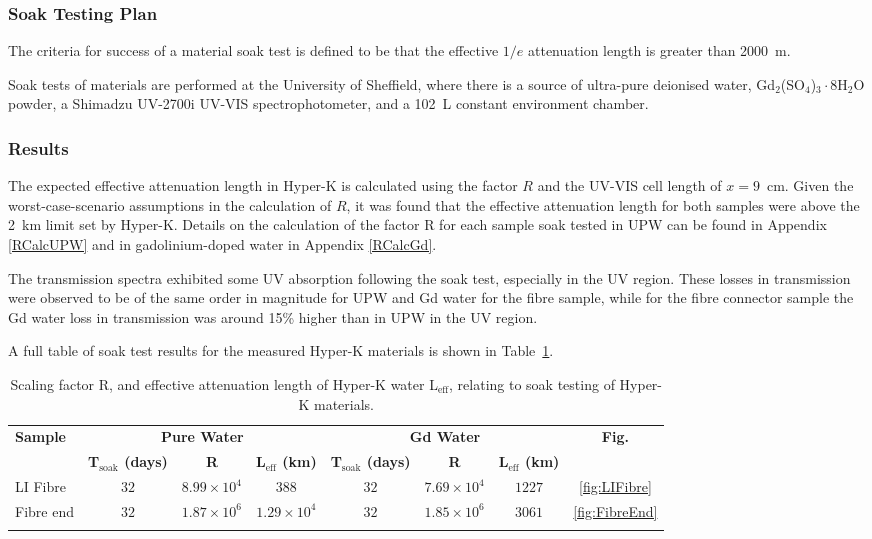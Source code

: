 \documentclass[a4paper,11pt]{article}
\newcommand{\hk}{Hyper-K\xspace}
\begin{document}
\subsubsection{Soak Testing Plan}
The criteria for success of a material soak test is defined to be that the effective $1/e$ attenuation length is greater than 2000~m.

Soak tests of materials are performed at the University of Sheffield, where there is a source of ultra-pure deionised water, Gd$_2$(SO$_4$)$_3\cdot$8H$_2$O powder, a Shimadzu UV-2700i UV-VIS spectrophotometer, and a 102~L constant environment chamber.

\subsubsection{Results}

The expected effective attenuation length in \hk is calculated using the factor $R$ and the UV-VIS cell length of $x=9$~cm. Given the worst-case-scenario assumptions in the calculation of $R$, it was found that the effective attenuation length for both samples were above the 2~km limit set by \hk. Details on the calculation of the factor R for each sample soak tested in UPW can be found in Appendix \ref{RCalcUPW} and in gadolinium-doped water in Appendix \ref{RCalcGd}.

The transmission spectra exhibited some UV absorption following the soak test, especially in the UV region. These losses in transmission were observed to be of the same order in magnitude for UPW and Gd water for the fibre sample, while for the fibre connector sample the Gd water loss in transmission was around 15\% higher than in UPW in the UV region. 

A full table of soak test results for the measured \hk materials is shown in Table~\ref{tab:soakresults}.

\begin{longtable}{lccccccc}
\hline
\multirow{2}{*}{\textbf{Sample}} & \multicolumn{3}{c}{\textbf{Pure Water}} & \multicolumn{3}{c}{\textbf{Gd Water}} & \multirow{2}{*}{\textbf{Fig.}} \\ \cmidrule(l){2-4} \cmidrule(l){5-7} 
& \textbf{T$_\text{soak}$ (days)} & \textbf{R} & \textbf{L$_\text{eff}$ (km)} & \textbf{T$_\text{soak}$ (days)} & \textbf{R} & \textbf{L$_\text{eff}$ (km)} &  \\ \hline
LI Fibre & $32$ & $8.99 \times 10^4$ & $388$ & $32$ & $7.69 \times 10^4$ & $1227$ & \ref{fig:LIFibre} \\
Fibre end & $32$ & $1.87 \times 10^6$ & $1.29 \times 10^4$ & $32$ & $1.85 \times 10^6$ & $3061$ & \ref{fig:FibreEnd} \\
\hline
\caption{Scaling factor R, and effective attenuation length of \hk water L$_\text{eff}$, relating to soak testing of \hk materials. }
\label{tab:soakresults}
\end{longtable}
\end{document}
